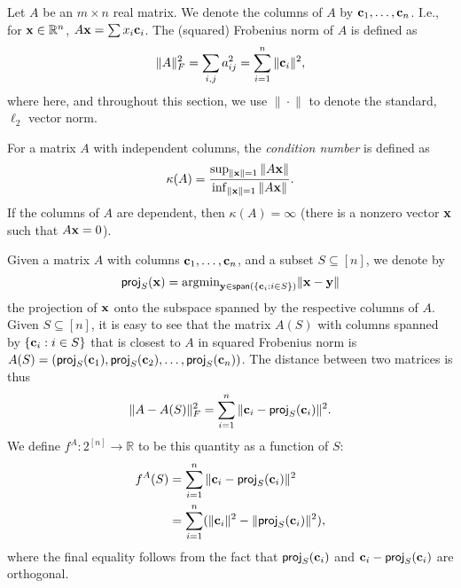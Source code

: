 \documentclass{article}
\newcommand{\reals}{\ensuremath{\mathbb{R}}}
\theoremstyle{definition}
\begin{document}
Let $A$ be an $m \times n$ real matrix. We denote the columns of $A$ by $\mathbf c_1,\ldots,\mathbf c_n$. I.e., for $\bx \in \reals^n$,
$A \mathbf x = \sum x_i \mathbf c_i$. The (squared) Frobenius norm of $A$ is defined as $$\|A\|^{2}_F = \sum_{i,j} a_{ij}^2 = \sum_{i=1}^{n} \|\mathbf c_i\|^2,$$ where here, and throughout this section, we use $\|\!\cdot\!\|$ to denote the standard, $\ell_{2}$ vector norm.

For a matrix $A$ with independent columns, the {\em condition number} is defined as
$$ \kappa(A) = \frac{\sup_{\|\mathbf x\|=1} \|A \mathbf x\|}{\inf_{\|\mathbf x\|=1} \|A \mathbf x\|}.$$  If the columns of $A$ are dependent, then $\kappa(A) = \infty$ (there is a nonzero vector $\mathbf x$ such that $A\mathbf x = 0$).

Given a matrix $A$ with columns $\mathbf c_1,\ldots,\mathbf c_n$, and a subset $S \subseteq [n]$, we denote by $$\mathsf{proj}_S(\mathbf x) = \mbox{argmin}_{\mathbf y \in \mathsf{span}(\{\mathbf c_i: i \in S\})} \|\mathbf x - \mathbf y\|$$ the projection of $\mathbf x$ onto the subspace spanned by the respective columns of $A$.
Given $S \subseteq [n]$, it is easy to see that the matrix $A(S)$ with columns spanned by $\{ \mathbf c_i: i \in S\}$ that is closest to $A$ in squared Frobenius norm is $A(S) = (\mathsf{proj}_S(\mathbf c_1), \mathsf{proj}_S(\mathbf c_2), \ldots, \mathsf{proj}_S(\mathbf c_n))$. The distance between  two matrices is thus
$$ \|A - A(S)\|^{2}_F= \sum_{i=1}^{n} \| \mathbf c_i - \mathsf{proj}_S(\mathbf c_i) \|^2.$$
We define $f^A:2^{[n]} \rightarrow \reals$ to be this quantity as a function of $S$:
\begin{align*}
f^A(S) &= \sum_{i=1}^{n} \| \mathbf c_i - \mathsf{proj}_S(\mathbf c_i) \|^2 \\
&= \sum_{i=1}^{n} ( \|\mathbf c_i\|^2 - \| \mathsf{proj}_S(\mathbf c_i) \|^2),
\end{align*}
where the final equality follows from the fact that $\mathsf{proj}_{S}(\mathbf c_i)$ and $\mathbf c_{i} - \mathsf{proj}_{S}(\mathbf c_{i})$ are orthogonal.
\end{document}
